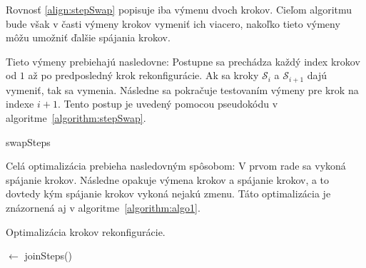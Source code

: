 \documentclass[
  digital, %
  oneside, %
  notable,   %
  lof,     %
  nolot,     %
]{fithesis3}
\begin{document}
Rovnosť \ref{align:stepSwap} popisuje iba výmenu dvoch krokov. Cieľom algoritmu bude však v časti výmeny krokov vymeniť ich viacero, nakoľko tieto výmeny môžu umožniť ďalšie spájania krokov. 

Tieto výmeny prebiehajú nasledovne: Postupne sa prechádza každý index krokov od $1$ až po predposledný krok rekonfigurácie. Ak sa kroky $\mathcal{S}_i$ a $\mathcal{S}_{i + 1}$ dajú vymeniť, tak sa vymenia. Následne sa pokračuje testovaním výmeny pre krok na indexe $i + 1$. Tento postup je uvedený pomocou pseudokódu v algoritme~\ref{algorithm:stepSwap}. 

\begin{algorithm}
    \caption{swapSteps}
    \label{algorithm:stepSwap}
    
    \DontPrintSemicolon
    
\end{algorithm}

Celá optimalizácia prebieha nasledovným spôsobom: V prvom rade sa vykoná spájanie krokov. Následne opakuje výmena krokov a spájanie krokov, a to dovtedy kým spájanie krokov vykoná nejakú zmenu. Táto optimalizácia je znázornená aj v algoritme~\ref{algorithm:algo1}. 

\begin{algorithm}
    \caption{Optimalizácia krokov rekonfigurácie. }
    \label{algorithm:algo1}
    
    \DontPrintSemicolon
    
    \Steps $\leftarrow$ joinSteps(\Steps)\;
\end{algorithm}
\end{document}
